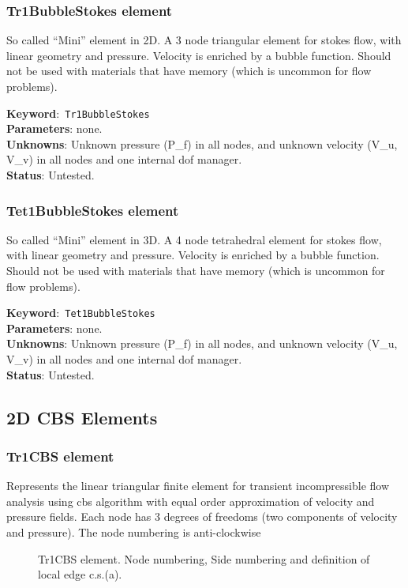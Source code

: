 \documentclass[a4paper]{article}
\newcommand{\descitem}[1]{{\noindent \textbf{#1}}:}
\newcommand{\elemkeyword}[1]{\descitem{Keyword}~\param{#1}} %
\newcommand{\param}[1]{\texttt{#1}} %
\begin{document}
\subsubsection{Tr1BubbleStokes element}
So called ``Mini'' element in 2D. A 3 node triangular element for stokes flow, with linear geometry and pressure. Velocity is enriched by a bubble function.
Should not be used with materials that have memory (which is uncommon for flow problems).

\elemkeyword{Tr1BubbleStokes}\\
\descitem{Parameters} none. \\
\descitem{Unknowns} Unknown pressure (P\_f) in all nodes, and unknown velocity (V\_u, V\_v) in all nodes and one internal dof manager. \\
\descitem{Status} Untested.

\subsubsection{Tet1BubbleStokes element}
So called ``Mini'' element in 3D. A 4 node tetrahedral element for stokes flow, with linear geometry and pressure. Velocity is enriched by a bubble function.
Should not be used with materials that have memory (which is uncommon for flow problems).

\elemkeyword{Tet1BubbleStokes}\\
\descitem{Parameters} none. \\
\descitem{Unknowns} Unknown pressure (P\_f) in all nodes, and unknown velocity (V\_u, V\_v) in all nodes and one internal dof manager. \\
\descitem{Status} Untested.

\clearpage
\subsection{2D CBS Elements}
\subsubsection{Tr1CBS element}
\label{Tr1CBS}
Represents the linear triangular finite element for transient
incompressible flow analysis using cbs algorithm with equal order
approximation of velocity and pressure fields. Each node has 3 degrees
of freedoms (two components of velocity and pressure).
The node numbering is anti-clockwise

\begin{figure}[htb]
 \centering
 \begin{makeimage}
  
 \end{makeimage}
 \caption{Tr1CBS element. Node numbering, Side numbering and
 definition of local edge c.s.(a).}
 \label{Tr1CBSfig}
\end{figure}
\end{document}

